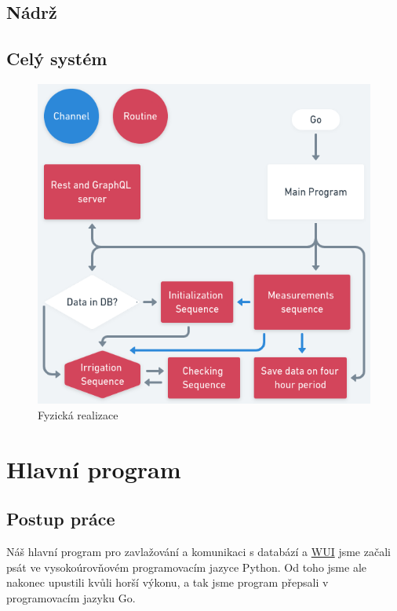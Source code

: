 \documentclass[12pt,a4paper]{article}
\begin{document}
\subsection{Nádrž}

\subsection{Celý systém}


\begin{figure}[h]
	\centering
	\includegraphics[width=0.72\linewidth]{go.png}
	\caption{Fyzická realizace}
\end{figure}

\clearpage

\section{Hlavní program}

\subsection{Postup práce}

Náš hlavní program pro zavlažování a komunikaci s databází a \underline{\ac{WUI}} jsme začali psát ve vysokoúrovňovém programovacím jazyce Python. Od toho jsme ale nakonec upustili kvůli horší výkonu, a tak jsme program přepsali v programovacím jazyku Go.
\end{document}
